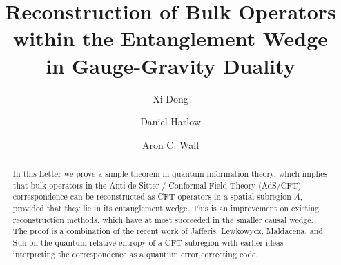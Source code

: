 \documentclass[aps,nofootinbib,longbibliography,superscriptaddress,12pt]{revtex4-1}
\begin{document}
\title{Reconstruction of Bulk Operators within the Entanglement Wedge
\\in Gauge-Gravity Duality}
\author{Xi Dong}
\author{Daniel Harlow}
\author{Aron C. Wall}
\begin{abstract}
In this Letter we prove a simple theorem in quantum information theory, which implies that bulk operators in the Anti-de Sitter / Conformal Field Theory (AdS/CFT) correspondence can be reconstructed as CFT operators in a spatial subregion $A$, provided that they lie in its entanglement wedge.  This is an improvement on existing reconstruction methods, which have at most succeeded in the smaller causal wedge.  The proof is a combination of the recent work of Jafferis, Lewkowycz, Maldacena, and Suh on the quantum relative entropy of a CFT subregion with earlier ideas interpreting the correspondence as a quantum error correcting code.
\end{abstract}

\maketitle
\end{document}
